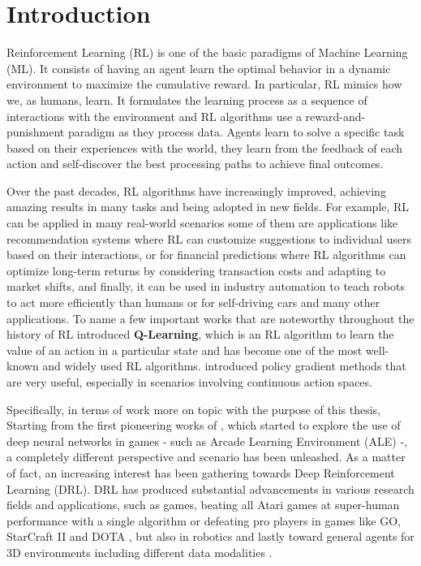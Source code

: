 
\chapter{Introduction}
\label{sec:introduction}
Reinforcement Learning (RL) \citep{sutton1998introduction} is one of the basic paradigms of Machine Learning (ML). It consists of having an agent learn the optimal behavior in a dynamic environment to maximize the cumulative reward.
In particular, RL mimics how we, as humans, learn.
It formulates the learning process as a sequence of interactions with the environment and RL algorithms use a reward-and-punishment paradigm as they process data.
Agents learn to solve a specific task based on their experiences with the world, they learn from the feedback of each action and self-discover the best processing paths to achieve final outcomes.

Over the past decades, RL algorithms have increasingly improved, achieving amazing results in many tasks and being adopted in new fields.
For example, RL can be applied in many real-world scenarios some of them are applications like recommendation systems where RL can customize suggestions to individual users based on their interactions, or for financial predictions where RL algorithms can optimize long-term returns by considering transaction costs and adapting to market shifts, and finally, it can be used in industry automation to teach robots to act more efficiently than humans or for self-driving cars and many other applications.
To name a few important works that are noteworthy throughout the history of RL \citet{watkins1992q} introduced \textbf{Q-Learning}, which is an RL algorithm to learn the value of an action in a particular state and has become one of the most well-known and widely used RL algorithms.
\citep{sutton1999policy} introduced policy gradient methods that are very useful, especially in scenarios involving continuous action spaces.

Specifically, in terms of work more on topic with the purpose of this thesis,
Starting from the first pioneering works of \citet{mnih2013playing, mnih2015human}, which started to explore the use of deep neural networks in games - such as Arcade Learning Environment (ALE) \citep{bellemare2013atari} -, a completely different perspective and scenario has been unleashed. As a matter of fact, an increasing interest has been gathering towards Deep Reinforcement Learning (DRL). DRL has produced substantial advancements in various research fields and applications, such as games, beating all Atari games at super-human performance with a single algorithm \citep{agent57} or defeating pro players in games like GO, StarCraft II and DOTA \citep{alphago, starcraft, dota}, but also in robotics \citep{rlrob, bousmalis2023robocat} and lastly toward general agents for 3D environments including different data modalities \citep{sima2024}.

